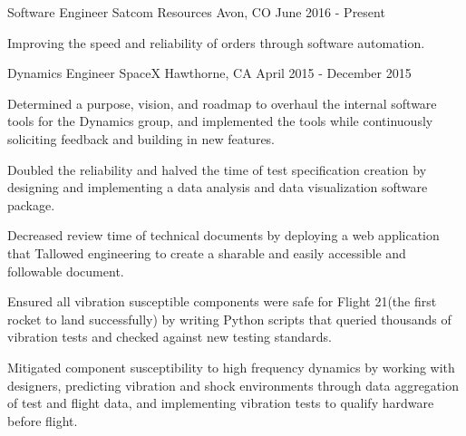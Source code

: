 

\begin{cventries}

  \cventry
    {Software Engineer} %
    {Satcom Resources} %
    {Avon, CO} %
    {June 2016 - Present} %
    {
      \begin{cvitems} %
        \item {Improving the speed and reliability of orders through software automation.}
      \end{cvitems}
    }

  \cventry
    {Dynamics Engineer} %
    {SpaceX} %
    {Hawthorne, CA} %
    {April 2015 - December 2015} %
    {
      \begin{cvitems} %
        \item{Determined a purpose, vision, and roadmap to overhaul the internal software tools for the Dynamics group, and implemented the tools while continuously soliciting feedback and building in new features.}
        \item {Doubled the reliability and halved the time of test specification creation by designing and implementing a data analysis and data visualization software package.}
        \item {Decreased review time of technical documents by deploying a web application that Tallowed engineering to create a sharable and easily accessible and followable document.}
        \item {Ensured all vibration susceptible components were safe for Flight 21(the first rocket to land successfully) by writing Python scripts that queried thousands of vibration tests and checked against new testing standards.}
        \item {Mitigated component susceptibility to high frequency dynamics by working with designers, predicting vibration and shock environments through data aggregation of test and flight data, and implementing vibration tests to qualify hardware before flight.}
      \end{cvitems}
    }


\end{cventries}
